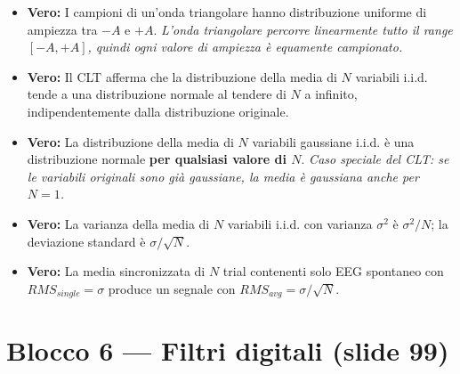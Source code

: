 \begin{itemize}
    \item \textbf{Vero:} I campioni di un'onda triangolare hanno distribuzione uniforme di ampiezza tra $-A$ e $+A$.
    \textit{L'onda triangolare percorre linearmente tutto il range $[-A,+A]$, quindi ogni valore di ampiezza è equamente campionato.}
    
    \item \textbf{Vero:} Il CLT afferma che la distribuzione della media di $N$ variabili i.i.d. tende a una distribuzione normale al tendere di $N$ a infinito, indipendentemente dalla distribuzione originale.
    
    \item \textbf{Vero:} La distribuzione della media di $N$ variabili gaussiane i.i.d. è una distribuzione normale \textbf{per qualsiasi valore di $N$}.
    \textit{Caso speciale del CLT: se le variabili originali sono già gaussiane, la media è gaussiana anche per $N=1$.}
    
    \item \textbf{Vero:} La varianza della media di $N$ variabili i.i.d. con varianza $\sigma^2$ è $\sigma^2/N$; la deviazione standard è $\sigma/\sqrt{N}$.
    
    \item \textbf{Vero:} La media sincronizzata di $N$ trial contenenti solo EEG spontaneo con $RMS_{single} = \sigma$ produce un segnale con $RMS_{avg} = \sigma/\sqrt{N}$.
\end{itemize}

\section{Blocco 6 — Filtri digitali (slide 99)}

